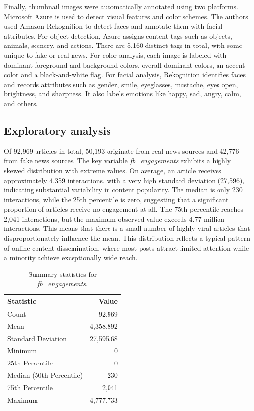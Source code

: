\documentclass[a4paper,twoside,12pt]{book}
\begin{document}
	Finally, thumbnail images were automatically annotated using two platforms. Microsoft Azure is used to detect visual features and color schemes. The authors used Amazon Rekognition to detect faces and annotate them with facial attributes. For object detection, Azure assigns content tags such as objects, animals, scenery, and actions. There are 5,160 distinct tags in total, with some unique to fake or real news. For color analysis, each image is labeled with dominant foreground and background colors, overall dominant colors, an accent color and a black-and-white flag. For facial analysis, Rekognition identifies faces and records attributes such as gender, smile, eyeglasses, mustache, eyes open, brightness, and sharpness. It also labels emotions like happy, sad, angry, calm, and others.
	
	\subsection*{Exploratory analysis}
	
	Of 92,969 articles in total, 50,193 originate from real news sources and 42,776 from fake news sources. The key variable \textit{fb\_engagements} exhibits a highly skewed distribution with extreme values. On average, an article receives approximately 4,359 interactions, with a very high standard deviation (27,596), indicating substantial variability in content popularity. The median is only 230 interactions, while the 25th percentile is zero, suggesting that a significant proportion of articles receive no engagement at all. The 75th percentile reaches 2,041 interactions, but the maximum observed value exceeds 4.77 million interactions. This means that there is a small number of highly viral articles that disproportionately influence the mean. This distribution reflects a typical pattern of online content dissemination, where most posts attract limited attention while a minority achieve exceptionally wide reach.
	
	\begin{table}[h!]
		\centering
		\caption{Summary statistics for \textit{fb\_engagements}.}
		\vspace{0.5em}
		\begin{tabular}{l r}
			\hline
			Statistic & Value \\
			\hline
			Count & 92,969 \\
			Mean & 4,358.892 \\
			Standard Deviation & 27,595.68 \\
			Minimum & 0 \\
			25th Percentile & 0 \\
			Median (50th Percentile) & 230 \\
			75th Percentile & 2,041 \\
			Maximum & 4,777,733 \\
			\hline
		\end{tabular}
	\end{table}
	
\end{document}
